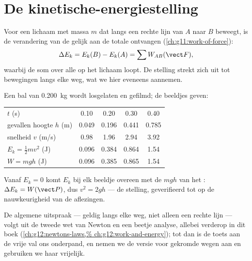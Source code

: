\section{De kinetische-energiestelling}

\begin{theorem}\label{thm:g11:mechanical-energy:ketheorem}
Voor een lichaam met massa $m$ dat langs een rechte lijn van $A$ naar $B$
beweegt, is de verandering van de  gelijk aan de totale
ontvangen  (\cref{ch:g11:work-of-force}):
\[
\Delta E_k = E_k(B) - E_k(A) = \sum W_{AB}(\vect F),
\]
waarbij de som over alle  op het lichaam loopt. De stelling
strekt zich uit tot bewegingen langs elke weg, wat we hier eveneens
aannemen.
\end{theorem}
\admitted

\begin{example}\label{ex:g11:mechanical-energy:freefall}
Een bal van \qty{0.200}{kg} wordt losgelaten en gefilmd; de beeldjes
geven:
\begin{center}\small
\begin{tabular}{lcccc}
$t$ (\unit{s}) & 0.10 & 0.20 & 0.30 & 0.40\\
gevallen hoogte $h$ (\unit{m}) & 0.049 & 0.196 & 0.441 & 0.785\\
snelheid $v$ (\unit{m/s}) & 0.98 & 1.96 & 2.94 & 3.92\\
$E_k = \tfrac12 mv^2$ (\unit{J}) & 0.096 & 0.384 & 0.864 & 1.54\\
$W = mgh$ (\unit{J}) & 0.096 & 0.385 & 0.865 & 1.54
\end{tabular}
\end{center}
Vanaf $E_k = 0$ komt $E_k$ bij elk beeldje overeen met de  $mgh$
van het : $\Delta E_k = W(\vect P)$, dus $v^2 = 2gh$ --- de
stelling, geverifieerd tot op de nauwkeurigheid van de aflezingen.
\end{example}

\begin{remark}\label{rem:g11:mechanical-energy:proof}
De algemene uitspraak --- geldig langs elke weg, niet alleen een rechte
lijn --- volgt uit de tweede wet van Newton en een beetje analyse, allebei
verderop in dit boek (\cref{ch:g12:newtons-laws,%
ch:g12:work-and-energy}); tot dan is de toets aan de vrije val ons
onderpand, en nemen we de versie voor gekromde wegen aan en gebruiken we
haar vrijelijk.
\end{remark}

